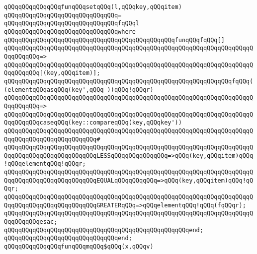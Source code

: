 \newline
\verb|qQQqqQQqqQQqqQQqfunqQQqsetqQQq(l,qQQqkey,qQQqitem)|\newline
\verb|qQQqqQQqqQQqqQQqqQQqqQQqqQQqqQQq=|\newline
\verb|qQQqqQQqqQQqqQQqqQQqqQQqqQQqqQQqfqQQql|\newline
\verb|qQQqqQQqqQQqqQQqqQQqqQQqqQQqqQQqwhere|\newline
\verb|qQQqqQQqqQQqqQQqqQQqqQQqqQQqqQQqqQQqqQQqqQQqqQQqfunqQQqfqQQq[]|\newline
\verb|qQQqqQQqqQQqqQQqqQQqqQQqqQQqqQQqqQQqqQQqqQQqqQQqqQQqqQQqqQQqqQQqqQQqqQQqqQQqqQQq=>|\newline
\verb|qQQqqQQqqQQqqQQqqQQqqQQqqQQqqQQqqQQqqQQqqQQqqQQqqQQqqQQqqQQqqQQqqQQqqQQqqQQqqQQq[(key,qQQqitem)];|\newline
\newline
\verb|qQQqqQQqqQQqqQQqqQQqqQQqqQQqqQQqqQQqqQQqqQQqqQQqqQQqqQQqqQQqqQQqfqQQq((elementqQQqasqQQq(key',qQQq_))qQQq!qQQqr)|\newline
\verb|qQQqqQQqqQQqqQQqqQQqqQQqqQQqqQQqqQQqqQQqqQQqqQQqqQQqqQQqqQQqqQQqqQQqqQQqqQQqqQQq=>|\newline
\verb|qQQqqQQqqQQqqQQqqQQqqQQqqQQqqQQqqQQqqQQqqQQqqQQqqQQqqQQqqQQqqQQqqQQqqQQqqQQqqQQqcaseqQQq(key::compareqQQq(key,qQQqkey'))|\newline
\verb|qQQqqQQqqQQqqQQqqQQqqQQqqQQqqQQqqQQqqQQqqQQqqQQqqQQqqQQqqQQqqQQqqQQqqQQqqQQqqQQqqQQqqQQqqQQqqQQq#|\newline
\verb|qQQqqQQqqQQqqQQqqQQqqQQqqQQqqQQqqQQqqQQqqQQqqQQqqQQqqQQqqQQqqQQqqQQqqQQqqQQqqQQqqQQqqQQqqQQqqQQqLESSqQQqqQQqqQQqqQQq=>qQQq(key,qQQqitem)qQQq!qQQqelementqQQq!qQQqr;|\newline
\verb|qQQqqQQqqQQqqQQqqQQqqQQqqQQqqQQqqQQqqQQqqQQqqQQqqQQqqQQqqQQqqQQqqQQqqQQqqQQqqQQqqQQqqQQqqQQqqQQqEQUALqQQqqQQqqQQq=>qQQq(key,qQQqitem)qQQq!qQQqr;|\newline
\verb|qQQqqQQqqQQqqQQqqQQqqQQqqQQqqQQqqQQqqQQqqQQqqQQqqQQqqQQqqQQqqQQqqQQqqQQqqQQqqQQqqQQqqQQqqQQqqQQqGREATERqQQq=>qQQqelementqQQq!qQQq(fqQQqr);|\newline
\verb|qQQqqQQqqQQqqQQqqQQqqQQqqQQqqQQqqQQqqQQqqQQqqQQqqQQqqQQqqQQqqQQqqQQqqQQqqQQqqQQqesac;|\newline
\verb|qQQqqQQqqQQqqQQqqQQqqQQqqQQqqQQqqQQqqQQqqQQqqQQqqQQqend;|\newline
\verb|qQQqqQQqqQQqqQQqqQQqqQQqqQQqqQQqend;|\newline
\newline
\newline
\verb|qQQqqQQqqQQqqQQqfunqQQqmqQQq$qQQq(x,qQQqv)|\newline
